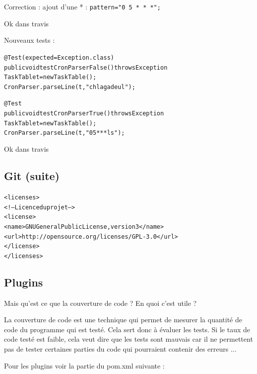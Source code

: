 \documentclass{article}
\begin{document}
Correction : ajout d'une * : \verb?pattern="0 5 * * *";?

Ok dans travis

Nouveaux tests : 

\begin{alltt}
  @Test(expected = Exception.class)
  public void testCronParserFalse() throws Exception {
    TaskTable t = new TaskTable ();
    CronParser.parseLine(t,"chlagadeul");
  }

  @Test
  public void testCronParserTrue() throws Exception {
    TaskTable t = new TaskTable ();
    CronParser.parseLine(t,"0 5 * * * ls");
  }
\end{alltt}

Ok dans travis

\subsection {Git (suite)}

\begin{alltt}
<licenses>
    <!--Licence du projet-->
    <license>
      <name>GNU General Public License, version 3</name>
      <url>http://opensource.org/licenses/GPL-3.0</url>
    </license>
</licenses>
\end{alltt}

\subsection {Plugins}

Mais qu'est ce que la couverture de code ? En quoi c'est utile ?

La couverture de code est une technique qui permet de mesurer la quantité de code du programme qui est testé.
	     Cela sert donc à évaluer les tests. Si le taux de code testé est faible, cela veut dire que les tests sont mauvais
	     car il ne permettent pas de tester certaines parties du code qui pourraient contenir des erreurs ...

Pour les plugins voir la partie du pom.xml suivante :
\end{document}
